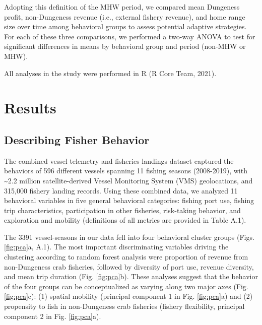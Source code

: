 \documentclass[]{elsarticle} %
\begin{document}
Adopting this definition of the MHW period, we compared mean Dungeness
profit, non-Dungeness revenue (i.e., external fishery revenue), and home
range size over time among behavioral groups to assess potential
adaptive strategies. For each of these three comparisons, we performed a
two-way ANOVA to test for significant differences in means by behavioral
group and period (non-MHW or MHW).

All analyses in the study were performed in R (R Core Team, 2021).

\hypertarget{results}{%
\section{Results}\label{results}}

\hypertarget{describing-fisher-behavior}{%
\subsection{Describing Fisher
Behavior}\label{describing-fisher-behavior}}

The combined vessel telemetry and fisheries landings dataset captured
the behaviors of 596 different vessels spanning 11 fishing seasons
(2008-2019), with \textasciitilde2.2 million satellite-derived Vessel
Monitoring System (VMS) geolocations, and 315,000 fishery landing
records. Using these combined data, we analyzed 11 behavioral variables
in five general behavioral categories: fishing port use, fishing trip
characteristics, participation in other fisheries, risk-taking behavior,
and exploration and mobility (definitions of all metrics are provided in
Table A.1).

The 3391 vessel-seasons in our data fell into four behavioral cluster
groups (Figs. \ref{fig:pca}a, A.1). The most important discriminating
variables driving the clustering according to random forest analysis
were proportion of revenue from non-Dungeness crab fisheries, followed
by diversity of port use, revenue diversity, and mean trip duration
(Fig. \ref{fig:pca}b). These analyses suggest that the behavior of the
four groups can be conceptualized as varying along two major axes (Fig.
\ref{fig:pca}c): (1) spatial mobility (principal component 1 in Fig.
\ref{fig:pca}a) and (2) propensity to fish in non-Dungeness crab
fisheries (fishery flexibility, principal component 2 in Fig.
\ref{fig:pca}a).
\end{document}
